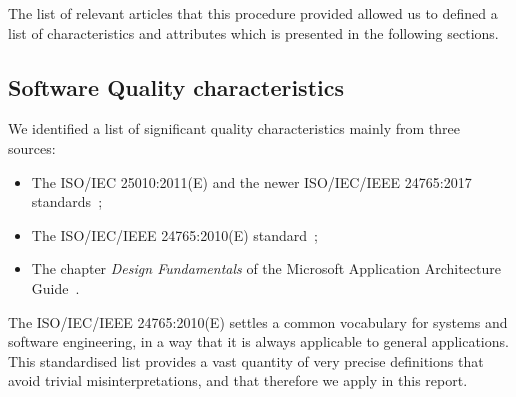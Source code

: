
The list of relevant articles that this procedure provided allowed us to defined a list of characteristics and attributes which is presented in the following sections.

\subsection{Software Quality characteristics}
\label{subsect:sqchar}

We identified a list of significant quality characteristics mainly from three sources:

\begin{itemize}
    \item The ISO/IEC 25010:2011(E) and the newer ISO/IEC/IEEE 24765:2017 standards~\cite{iso_25010_2011_2017};
    \item The ISO/IEC/IEEE 24765:2010(E) standard~\cite{iso_central_secretary_isoiecieee_2010};
    \item The chapter \textit{Design Fundamentals} of the Microsoft Application Architecture Guide~\cite{microsoft_2010}.
\end{itemize}

The ISO/IEC/IEEE 24765:2010(E) settles a common vocabulary for systems and software engineering, in a way that it is always applicable to general applications. This standardised list provides a vast quantity of very precise definitions that avoid trivial misinterpretations, and that therefore we apply in this report.


